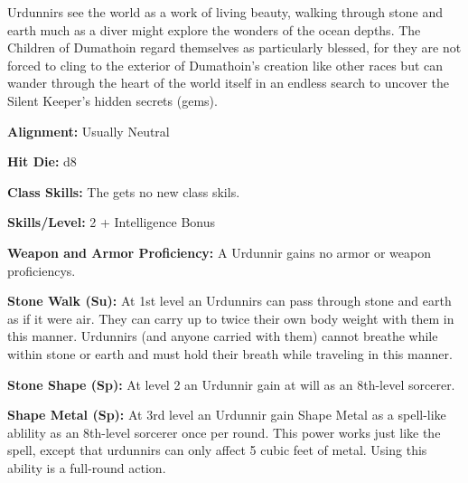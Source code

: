 
Urdunnirs see the world as a work of living beauty, walking through stone and earth much as a diver might explore the wonders of the ocean depths. The Children of Dumathoin regard themselves as particularly blessed, for they are not forced to cling to the exterior of Dumathoin’s creation like other races but can wander through the heart of the world itself in an endless search to uncover the Silent Keeper’s hidden secrets (gems).

\textbf{Alignment:} Usually Neutral

\textbf{Hit Die:} d8

\textbf{Class Skills:} The \currentclassname{} gets no new class skils.

\textbf{Skills/Level:} 2 + Intelligence Bonus

\modebab{}
\poorfor{}
\poorref{}
\goodwil{}

\begin{classtable}
\end{classtable}

\classfeatures

\textbf{Weapon and Armor Proficiency:} A Urdunnir gains no armor or weapon proficiencys.

\textbf{Stone Walk (Su):} At 1st level an Urdunnirs can pass through stone and earth as if it were air. They can carry up to twice their own body weight with them in this manner. Urdunnirs (and anyone carried with them) cannot breathe while within stone or earth and must hold their breath while traveling in this manner.

\textbf{Stone Shape (Sp):} At level 2 an Urdunnir gain  at will as an 8th-level sorcerer.

\textbf{Shape Metal (Sp):} At 3rd level an Urdunnir gain Shape Metal as a spell-like ablility as an 8th-level sorcerer once per round. This power works just like the  spell, except that urdunnirs can only affect 5 cubic feet of metal. Using this ability is a full-round action.